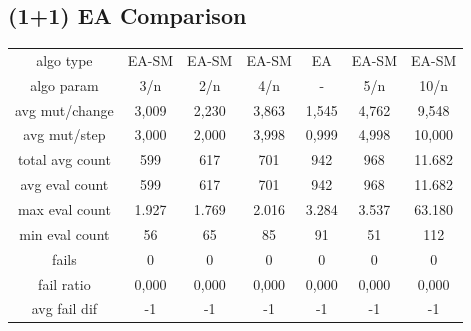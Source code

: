 \subsection{(1+1) EA Comparison}
\begin{tabular}[h]{ccccccc}
algo type&             EA-SM&      EA-SM&      EA-SM&         EA&      EA-SM&      EA-SM\\
algo param&              3/n&        2/n&        4/n&          -&        5/n&       10/n\\
avg mut/change&        3,009&      2,230&      3,863&      1,545&      4,762&      9,548\\
avg mut/step&          3,000&      2,000&      3,998&      0,999&      4,998&     10,000\\
\hline
total avg count&         599&        617&        701&        942&        968&     11.682\\
avg eval count&          599&        617&        701&        942&        968&     11.682\\
max eval count&        1.927&      1.769&      2.016&      3.284&      3.537&     63.180\\
min eval count&           56&         65&         85&         91&         51&        112\\
\hline
fails&                     0&          0&          0&          0&          0&          0\\
fail ratio&            0,000&      0,000&      0,000&      0,000&      0,000&      0,000\\
avg fail dif&             -1&         -1&         -1&         -1&         -1&         -1\\
\end{tabular}
